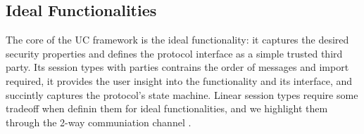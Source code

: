%
%

\subsection{Ideal Functionalities}
The core of the UC framework is the ideal functionality: it captures the desired security properties and defines the protocol interface as a simple trusted third party. 
Its session types with parties contrains the order of messages and import required, it provides the user insight into the functionality and its interface, and succintly captures the protocol's state machine.
Linear session types require some tradeoff when definin them for ideal functionalities, and we highlight them through the 2-way communiation channel \Fauth.

